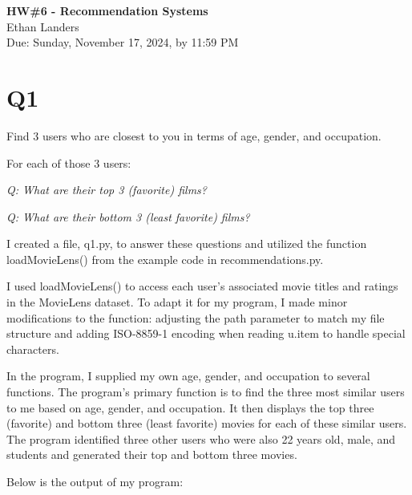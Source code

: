 \documentclass[12pt]{article}
\begin{document}
\begin{centering}
{\large\textbf{HW\#6 - Recommendation Systems}}\\ 
Ethan Landers\\
Due: Sunday, November 17, 2024, by 11:59 PM \\
\end{centering}


\section*{Q1}

Find 3 users who are closest to you in terms of age, gender, and occupation.

For each of those 3 users:

\emph{Q: What are their top 3 (favorite) films?}

\emph{Q: What are their bottom 3 (least favorite) films?}

I created a file, q1.py, to answer these questions and utilized the function loadMovieLens() from the example code in recommendations.py. 

I used loadMovieLens() to access each user's associated movie titles and ratings in the MovieLens dataset. To adapt it for my program, I made minor modifications to the function: adjusting the path parameter to match my file structure and adding ISO-8859-1 encoding when reading u.item to handle special characters.

In the program, I supplied my own age, gender, and occupation to several functions. The program's primary function is to find the three most similar users to me based on age, gender, and occupation. It then displays the top three (favorite) and bottom three (least favorite) movies for each of these similar users. The program identified three other users who were also 22 years old, male, and students and generated their top and bottom three movies.

Below is the output of my program:
\end{document}
